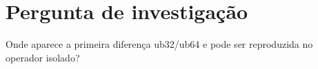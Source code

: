 \section{Pergunta de investigação}
Onde aparece a primeira diferença ub32/ub64 e pode ser reproduzida no operador isolado?
